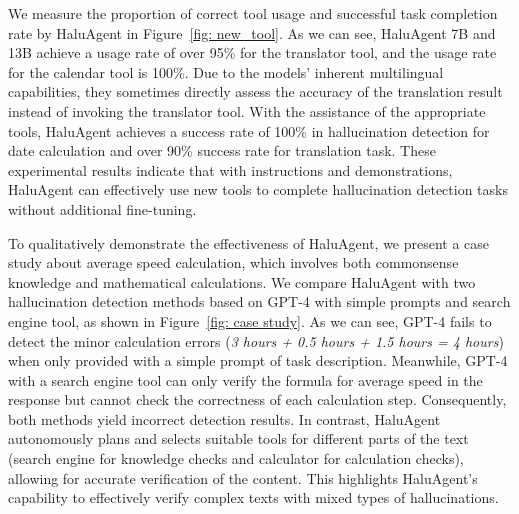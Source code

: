 We measure the proportion of correct tool usage and successful task completion rate by HaluAgent in Figure~\ref{fig: new_tool}. As we can see, HaluAgent 7B and 13B achieve a usage rate of over 95\% for the translator tool, and the usage rate for the calendar tool is 100\%. Due to the models' inherent multilingual capabilities, they sometimes directly assess the accuracy of the translation result instead of invoking the translator tool. With the assistance of the appropriate tools, HaluAgent achieves a success rate of 100\% in hallucination detection for date calculation and over 90\% success rate for translation task. These experimental results indicate that with instructions and demonstrations, HaluAgent can effectively use new tools to complete hallucination detection tasks without additional fine-tuning. 

To qualitatively demonstrate the effectiveness of HaluAgent, we present a case study about average speed calculation, which involves both commonsense knowledge and mathematical calculations. 
We compare HaluAgent with two hallucination detection methods based on GPT-4 with simple prompts and search engine tool, as shown in Figure~\ref{fig: case study}. 
As we can see, GPT-4 fails to detect the minor calculation errors (\ie \textit{3 hours + 0.5 hours + 1.5 hours = 4 hours}) when only provided with a simple prompt of task description. 
Meanwhile, GPT-4 with a search engine tool can only verify the formula for average speed in the response but cannot check the correctness of each calculation step. Consequently, both methods yield incorrect detection results.
In contrast, HaluAgent autonomously plans and selects suitable tools for different parts of the text (\ie search engine for knowledge checks and calculator for calculation checks), allowing for accurate verification of the content. This highlights HaluAgent's capability to effectively verify complex texts with mixed types of hallucinations.
